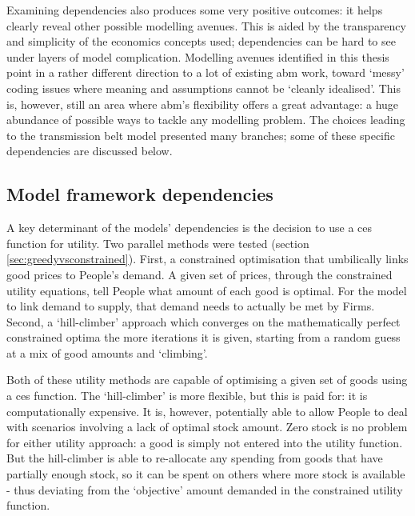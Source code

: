 Examining dependencies also produces some very positive outcomes: it helps clearly reveal other possible modelling avenues. This is aided by the transparency and simplicity of the economics concepts used; dependencies can be hard to see under layers of model complication. Modelling avenues identified in this thesis point in a rather different direction to a lot of existing \gls{abm} work, toward `messy' coding issues where meaning and assumptions cannot be `cleanly idealised'. This is, however, still  an area where \gls{abm}'s flexibility offers a great advantage: a huge abundance of possible ways to tackle any modelling problem. The choices leading to the transmission belt model presented many branches; some of these specific dependencies are discussed below. 

\subsection{Model framework dependencies \label{sec:depsframework}}

A key determinant of the models' dependencies is the decision to use a \gls{ces} function for utility. Two parallel methods were tested (section \ref{sec:greedyvsconstrained}). First, a constrained optimisation that umbilically links good prices to People's demand. A given set of prices, through the constrained utility equations, tell People what amount of each good is optimal. For the model to link demand to supply, that demand needs to actually be met by Firms. Second, a `hill-climber' approach which converges on the mathematically perfect constrained optima the more iterations it is given, starting from a random guess at a mix of good amounts and `climbing'. 

Both of these utility methods are capable of optimising a given set of goods using a \gls{ces} function. The `hill-climber' is more flexible, but this is paid for: it is computationally expensive. It is, however, potentially able to allow People to deal with scenarios involving a lack of optimal stock amount. Zero stock is no problem for either utility approach: a good is simply not entered into the utility function. But the hill-climber is able to re-allocate any spending from goods that have partially enough stock, so it can be spent on others where more stock is available - thus deviating from the `objective' amount demanded in the constrained utility function.

